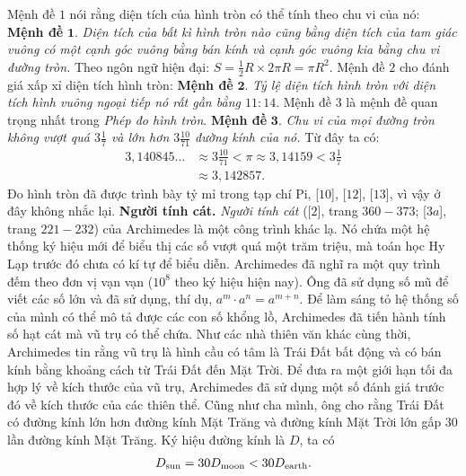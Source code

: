 \begin{multicols}{2}
	\vskip 0.1cm
	Mệnh đề $1$ nói rằng diện tích của hình tròn có thể tính theo chu vi của nó:
	\vskip 0.1cm
	\textbf{\color{lichsutoanhoc}Mệnh đề} $\pmb{1.}$ \textit{Diện tích của bất kì hình tròn nào cũng bằng diện tích của tam giác vuông có một cạnh góc vuông bằng bán kính và cạnh góc vuông kia bằng chu vi đường tròn.}
	\vskip 0.1cm
	Theo ngôn ngữ hiện đại: $S = \frac{1}{2}R \times 2\pi R = \pi {R^2}.$
	\vskip 0.1cm 
	Mệnh đề $2$ cho đánh giá xấp xỉ diện tích hình tròn:
	\vskip 0.1cm
	\textbf{\color{lichsutoanhoc}Mệnh đề} $\pmb{2.}$ \textit{Tỷ lệ diện tích hình tròn với diện tích hình vuông ngoại tiếp nó rất gần bằng $11:14$}.
	\vskip 0.1cm
	Mệnh đề $3$ là mệnh đề quan trọng nhất trong \textit{Phép đo hình tròn}.
	\vskip 0.1cm
	\textbf{\color{lichsutoanhoc}Mệnh đề} $\pmb{3.}$ \textit{Chu vi của mọi đường tròn không vượt quá $3\frac{1}{7}$ và lớn hơn $3\frac{10}{71}$  đường kính của nó.}
	\vskip 0.1cm
	Từ đây ta có: 
	\begin{align*}
		3{,}140845... &\approx 3\frac{{10}}{{71}} < \pi  \approx 3{,}14159 < 3\frac{1}{7} \\
		&\approx 3{,}142857.
	\end{align*}
	Đo hình tròn đã được trình bày tỷ mỉ trong tạp chí Pi, [$10$], [$12$], [$13$], vì vậy ở đây không nhắc lại.
	\vskip 0.1cm
	\textbf{\color{lichsutoanhoc}Người tính cát.} \textit{Người tính cát} ([$2$], trang $360-373$; [$3a$], trang $221-232$) của Archimedes là một công trình khác lạ. Nó chứa một hệ thống ký hiệu mới để biểu thị các số vượt quá một trăm triệu, mà toán học Hy Lạp trước đó chưa có kí tự để biểu diễn. Archimedes đã nghĩ ra một quy trình đếm theo đơn vị vạn vạn ($10^8$ theo ký hiệu hiện nay). Ông đã sử dụng số mũ để viết các số lớn và đã sử dụng, thí dụ,  ${a^m} \cdot {a^n} = {a^{m + n}}.$
	\vskip 0.1cm 
	Để làm sáng tỏ hệ thống số của mình có thể mô tả được các con số khổng lồ, Archimedes đã tiến hành tính số hạt cát mà vũ trụ có thể chứa. Như các nhà thiên văn khác cùng thời, Archimedes tin rằng vũ trụ là hình cầu có tâm là Trái Đất bất động và có bán kính bằng khoảng cách từ Trái Đất đến Mặt Trời. Để đưa ra một giới hạn tối đa hợp lý về kích thước của vũ trụ, Archimedes đã sử dụng một số đánh giá trước đó về kích thước của các thiên thể. Cũng như cha mình, ông cho rằng Trái Đất có đường kính lớn hơn đường kính Mặt Trăng và đường kính Mặt Trời lớn gấp $30$ lần đường kính Mặt Trăng. 
	\vskip 0.1cm
	Ký hiệu đường kính là $D$, ta có
	\begin{align*}
		{D_{{\rm{sun}}}} = 30{D_{{\rm{moon}}}} < 30{D_{{\rm{earth}}}}.
	\end{align*}

\end{multicols}
